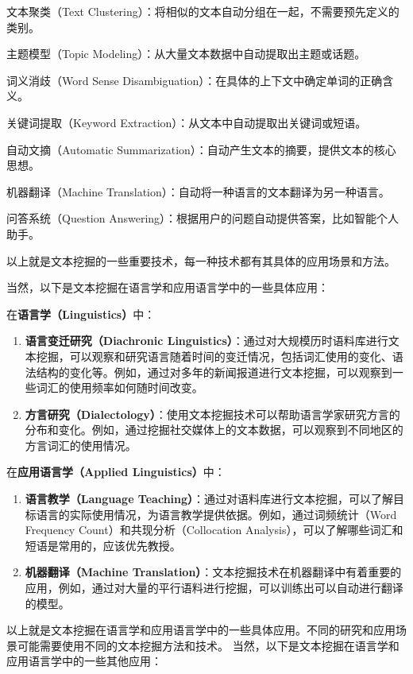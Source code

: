 \documentclass[]{book}
\begin{document}
文本聚类（Text Clustering）：将相似的文本自动分组在一起，不需要预先定义的类别。

主题模型（Topic Modeling）：从大量文本数据中自动提取出主题或话题。

词义消歧（Word Sense Disambiguation）：在具体的上下文中确定单词的正确含义。

关键词提取（Keyword Extraction）：从文本中自动提取出关键词或短语。

自动文摘（Automatic Summarization）：自动产生文本的摘要，提供文本的核心思想。

机器翻译（Machine Translation）：自动将一种语言的文本翻译为另一种语言。

问答系统（Question Answering）：根据用户的问题自动提供答案，比如智能个人助手。

以上就是文本挖掘的一些重要技术，每一种技术都有其具体的应用场景和方法。

当然，以下是文本挖掘在语言学和应用语言学中的一些具体应用：

在\textbf{语言学（Linguistics）}中：

\begin{enumerate}
\def\labelenumi{\arabic{enumi}.}
\item
  \textbf{语言变迁研究（Diachronic Linguistics）}：通过对大规模历时语料库进行文本挖掘，可以观察和研究语言随着时间的变迁情况，包括词汇使用的变化、语法结构的变化等。例如，通过对多年的新闻报道进行文本挖掘，可以观察到一些词汇的使用频率如何随时间改变。
\item
  \textbf{方言研究（Dialectology）}：使用文本挖掘技术可以帮助语言学家研究方言的分布和变化。例如，通过挖掘社交媒体上的文本数据，可以观察到不同地区的方言词汇的使用情况。
\end{enumerate}

在\textbf{应用语言学（Applied Linguistics）}中：

\begin{enumerate}
\def\labelenumi{\arabic{enumi}.}
\item
  \textbf{语言教学（Language Teaching）}：通过对语料库进行文本挖掘，可以了解目标语言的实际使用情况，为语言教学提供依据。例如，通过词频统计（Word Frequency Count）和共现分析（Collocation Analysis），可以了解哪些词汇和短语是常用的，应该优先教授。
\item
  \textbf{机器翻译（Machine Translation）}：文本挖掘技术在机器翻译中有着重要的应用，例如，通过对大量的平行语料进行挖掘，可以训练出可以自动进行翻译的模型。
\end{enumerate}

以上就是文本挖掘在语言学和应用语言学中的一些具体应用。不同的研究和应用场景可能需要使用不同的文本挖掘方法和技术。
当然，以下是文本挖掘在语言学和应用语言学中的一些其他应用：
\end{document}
